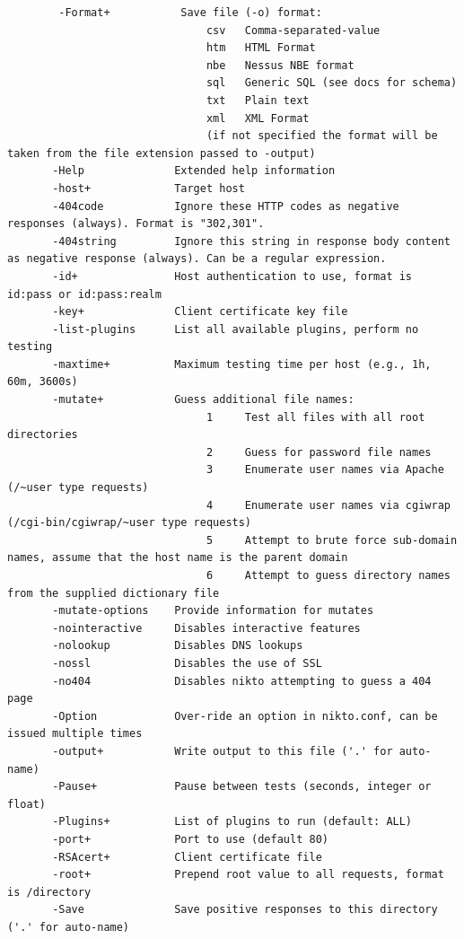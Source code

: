 \documentclass{article}
\begin{document}
\begin{lstlisting}
        -Format+           Save file (-o) format:
                               csv   Comma-separated-value
                               htm   HTML Format
                               nbe   Nessus NBE format
                               sql   Generic SQL (see docs for schema)
                               txt   Plain text
                               xml   XML Format
                               (if not specified the format will be taken from the file extension passed to -output)
       -Help              Extended help information
       -host+             Target host
       -404code           Ignore these HTTP codes as negative responses (always). Format is "302,301".
       -404string         Ignore this string in response body content as negative response (always). Can be a regular expression.
       -id+               Host authentication to use, format is id:pass or id:pass:realm
       -key+              Client certificate key file
       -list-plugins      List all available plugins, perform no testing
       -maxtime+          Maximum testing time per host (e.g., 1h, 60m, 3600s)
       -mutate+           Guess additional file names:
                               1     Test all files with all root directories
                               2     Guess for password file names
                               3     Enumerate user names via Apache (/~user type requests)
                               4     Enumerate user names via cgiwrap (/cgi-bin/cgiwrap/~user type requests)
                               5     Attempt to brute force sub-domain names, assume that the host name is the parent domain
                               6     Attempt to guess directory names from the supplied dictionary file
       -mutate-options    Provide information for mutates
       -nointeractive     Disables interactive features
       -nolookup          Disables DNS lookups
       -nossl             Disables the use of SSL
       -no404             Disables nikto attempting to guess a 404 page
       -Option            Over-ride an option in nikto.conf, can be issued multiple times
       -output+           Write output to this file ('.' for auto-name)
       -Pause+            Pause between tests (seconds, integer or float)
       -Plugins+          List of plugins to run (default: ALL)
       -port+             Port to use (default 80)
       -RSAcert+          Client certificate file
       -root+             Prepend root value to all requests, format is /directory
       -Save              Save positive responses to this directory ('.' for auto-name)

\end{lstlisting}
\end{document}
